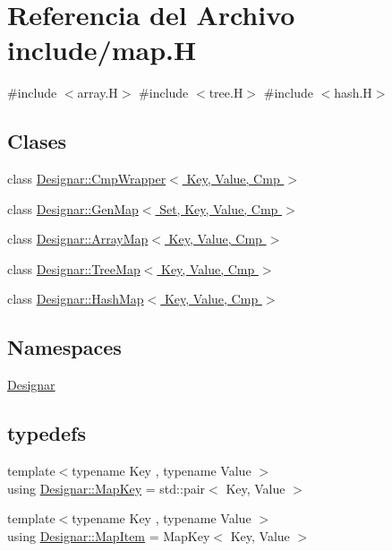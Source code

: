 \hypertarget{map_8_h}{}\section{Referencia del Archivo include/map.H}
\label{map_8_h}
{\ttfamily \#include $<$array.\+H$>$}\newline
{\ttfamily \#include $<$tree.\+H$>$}\newline
{\ttfamily \#include $<$hash.\+H$>$}\newline
\subsection*{Clases}
\begin{DoxyCompactItemize}
\item 
class \hyperlink{class_designar_1_1_cmp_wrapper}{Designar\+::\+Cmp\+Wrapper$<$ Key, Value, Cmp $>$}
\item 
class \hyperlink{class_designar_1_1_gen_map}{Designar\+::\+Gen\+Map$<$ Set, Key, Value, Cmp $>$}
\item 
class \hyperlink{class_designar_1_1_array_map}{Designar\+::\+Array\+Map$<$ Key, Value, Cmp $>$}
\item 
class \hyperlink{class_designar_1_1_tree_map}{Designar\+::\+Tree\+Map$<$ Key, Value, Cmp $>$}
\item 
class \hyperlink{class_designar_1_1_hash_map}{Designar\+::\+Hash\+Map$<$ Key, Value, Cmp $>$}
\end{DoxyCompactItemize}
\subsection*{Namespaces}
\begin{DoxyCompactItemize}
\item 
 \hyperlink{namespace_designar}{Designar}
\end{DoxyCompactItemize}
\subsection*{typedefs}
\begin{DoxyCompactItemize}
\item 
{\footnotesize template$<$typename Key , typename Value $>$ }\\using \hyperlink{namespace_designar_a7394b1b25278abf7211e77b91eb5204f}{Designar\+::\+Map\+Key} = std\+::pair$<$ Key, Value $>$
\item 
{\footnotesize template$<$typename Key , typename Value $>$ }\\using \hyperlink{namespace_designar_abc6ea5602461a15100a645d1f0e5cbcb}{Designar\+::\+Map\+Item} = Map\+Key$<$ Key, Value $>$
\end{DoxyCompactItemize}

